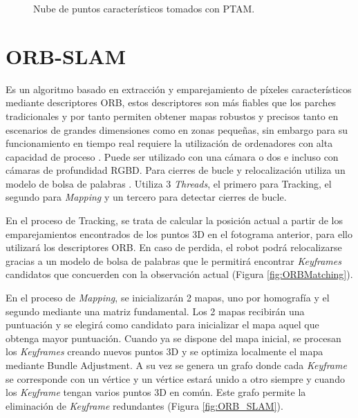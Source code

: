 \begin{figure}[H]
\begin{center}
\end{center}
\caption{Nube de puntos característicos tomados con PTAM.}
\end{figure}



\clearpage

\section{ORB-SLAM}
Es un algoritmo basado en extracción y emparejamiento de píxeles característicos mediante descriptores ORB, estos descriptores son más fiables que los parches tradicionales y por tanto permiten obtener mapas robustos y precisos tanto en escenarios de grandes dimensiones como en zonas pequeñas, sin embargo para su funcionamiento en tiempo real requiere la utilización de ordenadores con alta capacidad de proceso \cite{Mur2015orb}.
Puede ser utilizado con una cámara o dos e incluso con cámaras de profundidad RGBD. Para cierres de bucle y relocalización utiliza un modelo de bolsa de palabras \cite{galvez2012bags}.
Utiliza 3 \textit{Threads}, el primero para Tracking, el segundo para \textit{Mapping} y un tercero para detectar cierres de bucle. 

En el proceso de Tracking, se trata de calcular la posición actual a partir de los emparejamientos encontrados de los puntos 3D en el fotograma anterior, para ello utilizará los descriptores ORB.
En caso de perdida, el robot podrá relocalizarse gracias a un modelo de bolsa de palabras que le permitirá encontrar \textit{Keyframes} candidatos que concuerden con la observación actual (Figura \ref{fig:ORBMatching}).

En el proceso de \textit{Mapping}, se inicializarán 2 mapas, uno por homografía y el segundo mediante una matriz fundamental. Los 2 mapas recibirán una puntuación y se elegirá como candidato para inicializar el mapa aquel que obtenga mayor puntuación. Cuando ya se dispone del mapa inicial, se procesan los \textit{Keyframes} creando nuevos puntos 3D y se optimiza localmente el mapa mediante Bundle Adjustment. A su vez se genera un grafo donde cada \textit{Keyframe} se corresponde con un vértice y un vértice estará unido a otro siempre y cuando los \textit{Keyframe} tengan varios puntos 3D en común. Este grafo permite la eliminación de \textit{Keyframe} redundantes (Figura \ref{fig:ORB_SLAM}).

